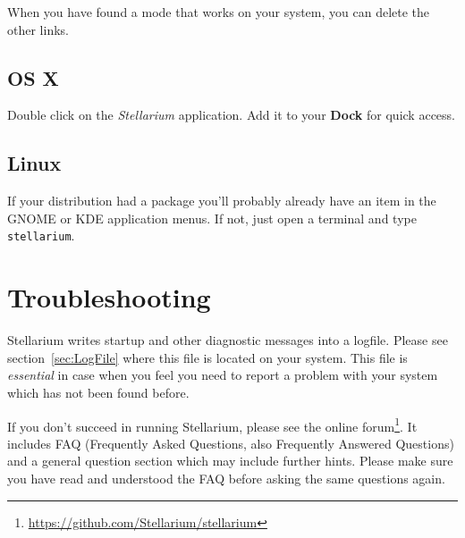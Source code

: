 When you have found a mode that works on your system, you can delete
the other links.

\subsection{OS X}
\label{sec:GettingStarted:Running:MacOSX}

Double click on the \emph{Stellarium} application.  Add it to your
\textbf{Dock} for quick access.

\subsection{Linux}
\label{sec:GettingStarted:Running:Linux}

If your distribution had a package you'll probably already have an
item in the GNOME or KDE application menus. If not, just open a
terminal and type \texttt{stellarium}.


\section{Troubleshooting}
\label{sec:GettingStarted:Running:Troubleshooting}

Stellarium writes startup and other diagnostic messages into a
logfile. Please see section~\ref{sec:LogFile} where this
file is located on your system. This file is \emph{essential} in case when
you feel you need to report a problem with your system which has not
been found before.

If you don't succeed in running Stellarium, please see the online
forum\footnote{\url{https://github.com/Stellarium/stellarium}}.  It includes
FAQ (Frequently Asked Questions, also Frequently Answered
Questions) and a general question section which may include
further hints. Please make sure you have read and understood the FAQ
before asking the same questions again.


